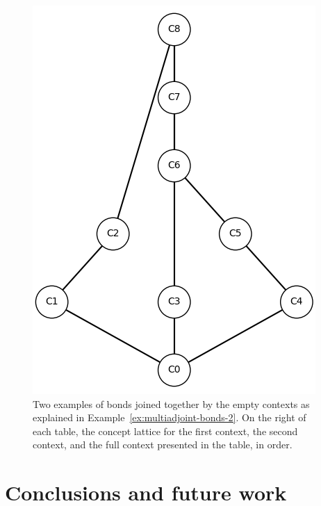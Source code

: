 \documentclass[runningheads,a4paper]{llncs}
\begin{document}
\begin{example}
\begin{figure}
\begin{minipage}{\textwidth}
\begin{minipage}{0.2\textwidth}
			\includegraphics[height = \textwidth]{im/ex-ma2-other-contexts-3+4.png}
		\end{minipage}
	\end{minipage}
	\caption{Two examples of bonds joined together by the empty contexts as explained in Example~\ref{ex:multiadjoint-bonds-2}. On the right of each table, the concept lattice for the first context, the second context, and the full context presented in the table, in order.}
	\label{fig:example2-multiadjoint-bonds-concept-lattices}
\end{figure}

\end{example}

\section{Conclusions and future work}


%
%

{\small


}
\end{document}
